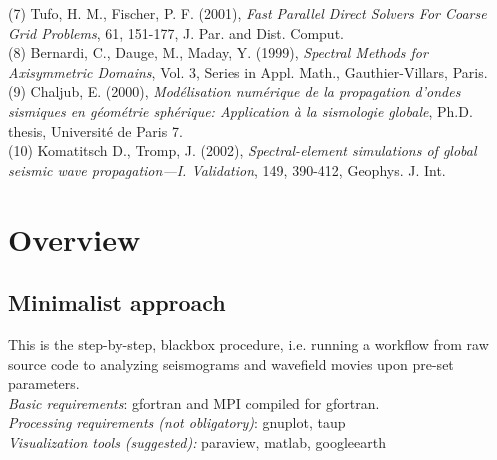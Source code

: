 \documentclass[11pt,letter,fleqn,english,notitlepage]{article}
\begin{document}
(7) Tufo, H. M., Fischer, P. F. (2001), \textit{Fast Parallel Direct Solvers For Coarse Grid Problems}, 
61, 151-177, J. Par. and Dist. Comput.\\

(8) Bernardi, C., Dauge, M., Maday, Y. (1999), \textit{Spectral Methods for Axisymmetric Domains}, 
Vol. 3, Series in Appl. Math., Gauthier-Villars, Paris.\\

(9) Chaljub, E. (2000), \textit{Mod{\'{e}}lisation num{\'{e}}rique de la 
propagation d'ondes sismiques en g{\'{e}}om{\'{e}}trie sph{\'{e}}rique: Application {\`{a}} la sismologie globale}, 
Ph.D. thesis, Universit{\'{e}} de Paris 7.\\

(10) Komatitsch D., Tromp, J. (2002), \textit{Spectral-element simulations of global seismic wave propagation---{I. V}alidation},
149, 390-412, Geophys. J. Int.

\section{Overview}

\subsection{Minimalist approach}
This is the step-by-step, blackbox procedure, i.e. running a workflow from raw source code to analyzing 
seismograms and wavefield movies upon pre-set parameters.\\

\noindent \textit{Basic requirements}: gfortran and MPI compiled for gfortran.\\
\textit{Processing requirements (not obligatory)}: gnuplot, taup\\
\textit{Visualization tools (suggested):} paraview, matlab, googleearth\\
\end{document}
